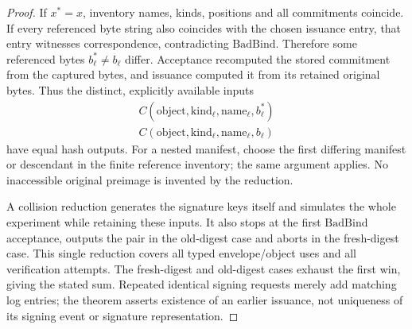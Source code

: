 \begin{proof}
If $x^*=x$, inventory names, kinds, positions and all commitments coincide.
If every referenced byte string also coincides with the chosen issuance
entry, that entry witnesses correspondence, contradicting
$\mathrm{BadBind}$. Therefore some referenced bytes $b_\ell^*\ne b_\ell$
differ. Acceptance recomputed the stored commitment from the captured
bytes, and issuance computed it from its retained original bytes. Thus
the distinct, explicitly available inputs
\[
 \begin{gathered}
 C(\mathrm{object},\mathrm{kind}_\ell,\mathrm{name}_\ell,b_\ell^*)
 \\
 C(\mathrm{object},\mathrm{kind}_\ell,\mathrm{name}_\ell,b_\ell)
 \end{gathered}
\]
have equal hash outputs. For a nested manifest, choose the first differing
manifest or descendant in the finite reference inventory; the same argument
applies. No inaccessible original preimage is invented by the reduction.

A collision reduction generates the signature keys itself and simulates the
whole experiment while retaining these inputs. It also stops at the first
$\mathrm{BadBind}$ acceptance, outputs the pair in the old-digest case
and aborts in the fresh-digest case. This single reduction covers all
typed envelope/object uses and all verification attempts. The fresh-digest
and old-digest cases exhaust the first win, giving the stated sum.
Repeated identical signing requests merely add matching log entries;
the theorem asserts existence of an earlier issuance, not uniqueness of
its signing event or signature representation.
\end{proof}


